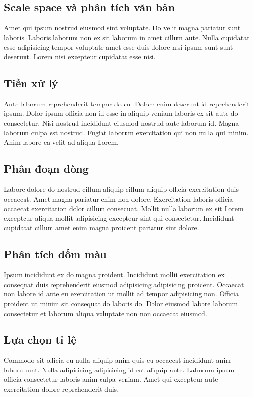 \documentclass[a4paper]{article}
\begin{document}
\subsection{Scale space và phân tích văn bản}
Amet qui ipsum nostrud eiusmod sint voluptate. Do velit magna pariatur sunt laboris. Laboris laborum non ex sit laborum in amet cillum aute. Nulla cupidatat esse adipisicing tempor voluptate amet esse duis dolore nisi ipsum sunt sunt deserunt. Lorem nisi excepteur cupidatat esse nisi.

\subsection{Tiền xử lý}
Aute laborum reprehenderit tempor do eu. Dolore enim deserunt id reprehenderit ipsum. Dolor ipsum officia non id esse in aliquip veniam laboris ex sit aute do consectetur. Nisi nostrud incididunt eiusmod nostrud aute laborum id. Magna laborum culpa est nostrud. Fugiat laborum exercitation qui non nulla qui minim. Anim labore ea velit ad aliqua Lorem.

\subsection{Phân đoạn dòng}
Labore dolore do nostrud cillum aliquip cillum aliquip officia exercitation duis occaecat. Amet magna pariatur enim non dolore. Exercitation laboris officia occaecat exercitation dolor cillum consequat. Mollit nulla laborum ex sit Lorem excepteur aliqua mollit adipisicing excepteur sint qui consectetur. Incididunt cupidatat cillum amet enim magna proident pariatur sint dolore.

\subsection{Phân tích đốm màu}
Ipsum incididunt ex do magna proident. Incididunt mollit exercitation ex consequat duis reprehenderit eiusmod adipisicing adipisicing proident. Occaecat non labore id aute eu exercitation ut mollit ad tempor adipisicing non. Officia proident ut minim sit consequat do laboris do. Dolor eiusmod labore laborum consectetur et laborum aliqua voluptate non non occaecat eiusmod.

\subsection{Lựa chọn tỉ lệ}
Commodo sit officia eu nulla aliquip anim quis eu occaecat incididunt anim labore sunt. Nulla adipisicing adipisicing id est aliquip aute. Laborum ipsum officia consectetur laboris anim culpa veniam. Amet qui excepteur aute exercitation dolore reprehenderit duis.
\end{document}
